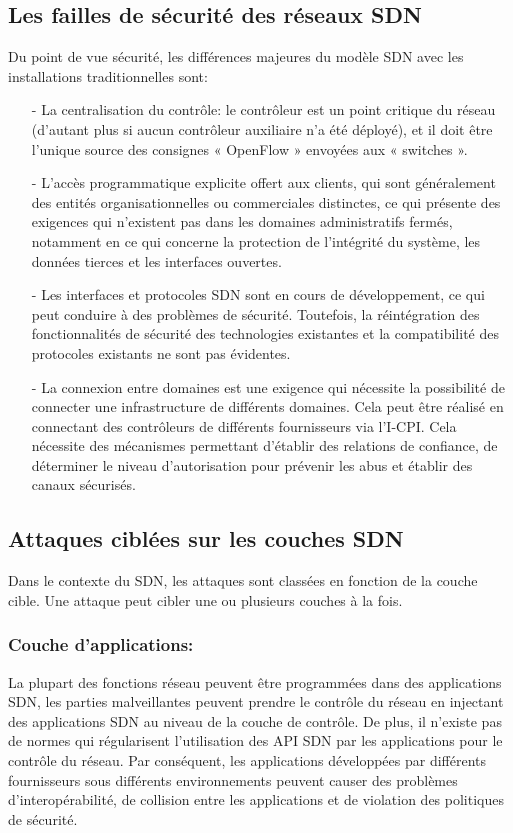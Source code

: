 \subsection{Les failles de sécurité des réseaux SDN}
Du point de vue sécurité, les différences majeures du modèle SDN avec les installations traditionnelles sont: \\
\begin{itemize}
\item[-]La centralisation du contrôle: le contrôleur est un point critique du réseau (d’autant plus si aucun contrôleur auxiliaire n’a été déployé), et il doit être l’unique source des consignes « OpenFlow » envoyées aux « switches ».\\
\item[-]L’accès programmatique explicite offert aux clients, qui sont généralement des entités organisationnelles  ou commerciales distinctes, ce qui présente des exigences qui n’existent pas dans les domaines administratifs fermés, notamment en ce qui concerne la protection de l’intégrité du système, les données tierces et les interfaces ouvertes.\\
\item[-]Les interfaces et protocoles SDN sont en cours de développement, ce qui peut conduire à des problèmes de sécurité. Toutefois, la réintégration des fonctionnalités de sécurité des technologies existantes et la compatibilité des protocoles existants ne sont pas évidentes.\\
\item[-]La connexion entre domaines est une exigence qui nécessite la possibilité de connecter une infrastructure de différents domaines. Cela peut être réalisé en connectant des contrôleurs de différents fournisseurs via l’I-CPI. Cela nécessite des mécanismes permettant d’établir des relations de confiance, de déterminer le niveau d’autorisation pour prévenir les abus et établir des canaux sécurisés.
\end{itemize}

\newpage
\subsection{Attaques ciblées sur les couches SDN}
\label{cibles}
Dans le contexte du SDN, les attaques sont classées en fonction de la couche cible. Une attaque peut cibler une ou plusieurs couches à la fois.
\subsubsection{Couche d'applications:} 
La plupart des fonctions réseau peuvent être programmées dans des applications SDN, les parties malveillantes peuvent prendre le contrôle du réseau en injectant des applications SDN au niveau de la couche de contrôle. De plus, il n’existe pas de normes qui régularisent l’utilisation des API SDN par les applications pour le contrôle du réseau. Par conséquent, les applications développées par différents fournisseurs sous différents environnements peuvent causer des problèmes d’interopérabilité, de collision entre les applications et de violation des politiques de sécurité.  

